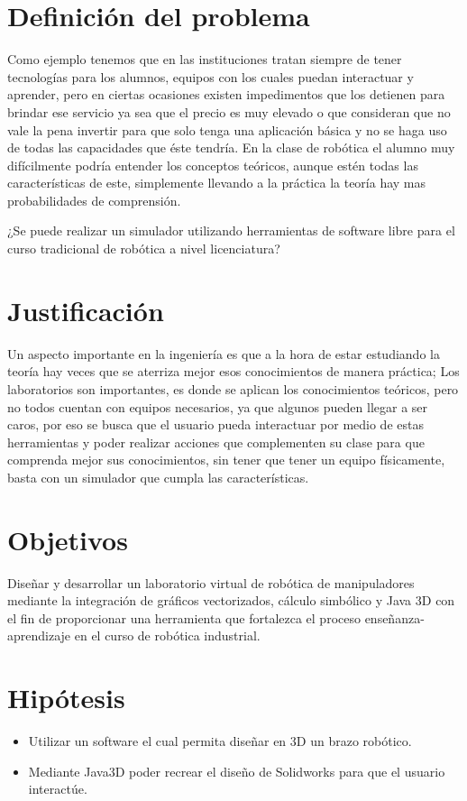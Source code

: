 \section{Definición del problema}
Como ejemplo tenemos que en las instituciones tratan siempre de tener tecnologías para los alumnos, equipos con los cuales puedan interactuar y aprender, pero en ciertas ocasiones existen impedimentos que los detienen para brindar ese servicio ya sea que el precio es muy elevado o que consideran que no vale la pena invertir para que solo tenga una aplicación básica y no se haga uso de todas las capacidades que éste tendría. En la clase de robótica el alumno muy difícilmente podría entender los conceptos teóricos, aunque estén todas las características de este, simplemente llevando a la práctica la teoría hay mas probabilidades de comprensión. 

¿Se puede realizar un simulador utilizando herramientas de software libre para el curso tradicional de robótica a nivel licenciatura?

\section{Justificación}
Un aspecto importante en la ingeniería es que a la hora de estar estudiando la teoría hay veces que se aterriza mejor esos conocimientos de manera práctica; Los laboratorios son importantes, es donde se aplican los conocimientos teóricos, pero no todos cuentan con equipos necesarios, ya que algunos pueden llegar a ser caros, por eso se busca que el usuario pueda interactuar por medio de estas herramientas y poder realizar acciones que complementen su clase para que comprenda mejor sus conocimientos, sin tener que tener un equipo físicamente, basta con un simulador que cumpla las características.

\section{Objetivos}
Diseñar y desarrollar un laboratorio virtual de robótica de manipuladores mediante la integración de gráficos vectorizados, cálculo simbólico y Java 3D con el fin de proporcionar una herramienta que fortalezca el proceso enseñanza-aprendizaje en el curso de robótica industrial.

\section{Hipótesis}
\begin{itemize}
\item Utilizar un software el cual permita diseñar en 3D un brazo robótico. 
\item Mediante Java3D poder recrear el diseño de Solidworks para que el usuario interactúe.
\end{itemize}

